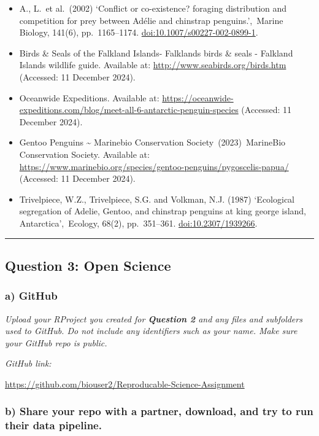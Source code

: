 \documentclass[
]{article}
\begin{document}
\begin{itemize}
\item
  A., L.~et al.~(2002) `Conflict or co-existence? foraging distribution
  and competition for prey between Adélie and chinstrap
  penguins.',~Marine Biology, 141(6), pp.~1165--1174.
  \url{doi:10.1007/s00227-002-0899-1}.~
\item
  Birds \& Seals of the Falkland Islands- Falklands birds \& seals -
  Falkland Islands wildlife guide. Available at:
  \url{http://www.seabirds.org/birds.htm} (Accessed: 11 December 2024).~
\item
  Oceanwide Expeditions. Available at:
  \url{https://oceanwide-expeditions.com/blog/meet-all-6-antarctic-penguin-species}
  (Accessed: 11 December 2024).~
\item
  Gentoo Penguins \textasciitilde{} Marinebio Conservation
  Society~(2023)~MarineBio Conservation Society. Available at:
  \url{https://www.marinebio.org/species/gentoo-penguins/pygoscelis-papua/}
  (Accessed: 11 December 2024).~
\item
  Trivelpiece, W.Z., Trivelpiece, S.G. and Volkman, N.J. (1987)
  `Ecological segregation of Adelie, Gentoo, and chinstrap penguins at
  king george island, Antarctica',~Ecology, 68(2), pp.~351--361.
  \url{doi:10.2307/1939266}.~
\end{itemize}

\begin{center}\rule{0.5\linewidth}{0.5pt}\end{center}

\subsection{Question 3: Open Science}\label{question-3-open-science}

\subsubsection{a) GitHub}\label{a-github}

\emph{Upload your RProject you created for \textbf{Question 2} and any
files and subfolders used to GitHub. Do not include any identifiers such
as your name. Make sure your GitHub repo is public.}

\emph{GitHub link:}

\url{https://github.com/biouser2/Reproducable-Science-Assignment}

\subsubsection{b) Share your repo with a partner, download, and try to
run their data
pipeline.}\label{b-share-your-repo-with-a-partner-download-and-try-to-run-their-data-pipeline.}
\end{document}

